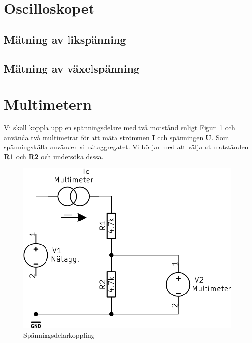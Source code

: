 \documentclass[11pt,a4paper]{article}
\begin{document}
\section{Oscilloskopet}\label{}

\subsection{Mätning av likspänning}\label{meas_dc}

\subsection{Mätning av växelspänning}\label{meas_ac}

\section{Multimetern}\label{}
Vi skall koppla upp en spänningsdelare med två motstånd enligt 
Figur~\ref{fig:2-mm-schem} och använda två multimetrar för att mäta strömmen 
\textbf{I} och spänningen \textbf{U}. Som spänningskälla använder vi 
nätaggregatet. Vi börjar med att välja ut motstånden \textbf{R1} och \textbf{R2}
och undersöka dessa.

\begin{figure}[htbp]
    \centering
        \includegraphics[scale=0.5]{kicad/2-multimeter-schema.png}
    \caption{Spänningsdelarkoppling}
    \label{fig:2-mm-schem}
\end{figure}
\end{document}

